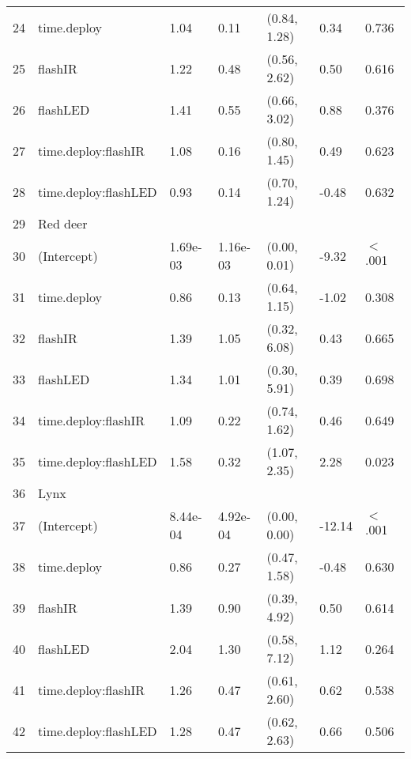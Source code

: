 \begin{table}[ht]
\begin{tabular}{rllllll}
  24 & time.deploy & 1.04 & 0.11 & (0.84, 1.28) & 0.34 & 0.736  \\ 
  25 & flashIR & 1.22 & 0.48 & (0.56, 2.62) & 0.50 & 0.616  \\ 
  26 & flashLED & 1.41 & 0.55 & (0.66, 3.02) & 0.88 & 0.376  \\ 
  27 & time.deploy:flashIR & 1.08 & 0.16 & (0.80, 1.45) & 0.49 & 0.623  \\ 
  28 & time.deploy:flashLED & 0.93 & 0.14 & (0.70, 1.24) & -0.48 & 0.632  \\ 
  29 & Red deer &  &  &  &  &        \\ 
  30 & (Intercept) & 1.69e-03 & 1.16e-03 & (0.00, 0.01) & -9.32 & $<$ .001 \\ 
  31 & time.deploy & 0.86 & 0.13 & (0.64, 1.15) & -1.02 & 0.308  \\ 
  32 & flashIR & 1.39 & 1.05 & (0.32, 6.08) & 0.43 & 0.665  \\ 
  33 & flashLED & 1.34 & 1.01 & (0.30, 5.91) & 0.39 & 0.698  \\ 
  34 & time.deploy:flashIR & 1.09 & 0.22 & (0.74, 1.62) & 0.46 & 0.649  \\ 
  35 & time.deploy:flashLED & 1.58 & 0.32 & (1.07, 2.35) & 2.28 & 0.023  \\ 
  36 & Lynx &  &  &  &  &        \\ 
  37 & (Intercept) & 8.44e-04 & 4.92e-04 & (0.00, 0.00) & -12.14 & $<$ .001 \\ 
  38 & time.deploy & 0.86 & 0.27 & (0.47, 1.58) & -0.48 & 0.630  \\ 
  39 & flashIR & 1.39 & 0.90 & (0.39, 4.92) & 0.50 & 0.614  \\ 
  40 & flashLED & 2.04 & 1.30 & (0.58, 7.12) & 1.12 & 0.264  \\ 
  41 & time.deploy:flashIR & 1.26 & 0.47 & (0.61, 2.60) & 0.62 & 0.538  \\ 
  42 & time.deploy:flashLED & 1.28 & 0.47 & (0.62, 2.63) & 0.66 & 0.506  \\ 
   \hline
\end{tabular}
\end{table}
